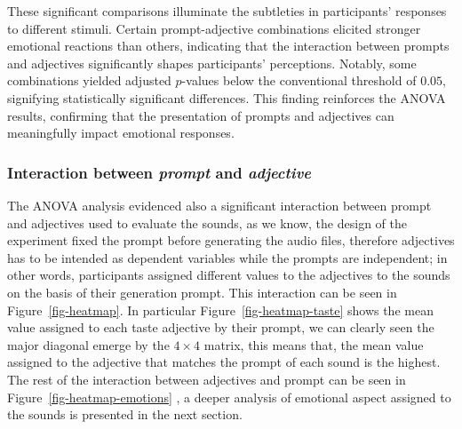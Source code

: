 \documentclass[
  letterpaper,
  DIV=11,
  numbers=noendperiod]{scrartcl}
\begin{document}
These significant comparisons illuminate the subtleties in participants'
responses to different stimuli. Certain prompt-adjective combinations
elicited stronger emotional reactions than others, indicating that the
interaction between prompts and adjectives significantly shapes
participants' perceptions. Notably, some combinations yielded adjusted
\(p\)-values below the conventional threshold of \(0.05\), signifying
statistically significant differences. This finding reinforces the ANOVA
results, confirming that the presentation of prompts and adjectives can
meaningfully impact emotional responses.

\subsubsection{\texorpdfstring{Interaction between \emph{prompt} and
\emph{adjective}}{Interaction between prompt and adjective}}\label{interaction-between-prompt-and-adjective}

The ANOVA analysis evidenced also a significant interaction between
prompt and adjectives used to evaluate the sounds, as we know, the
design of the experiment fixed the prompt before generating the audio
files, therefore adjectives has to be intended as dependent variables
while the prompts are independent; in other words, participants assigned
different values to the adjectives to the sounds on the basis of their
generation prompt. This interaction can be seen in
Figure~\ref{fig-heatmap}. In particular Figure~\ref{fig-heatmap-taste}
shows the mean value assigned to each taste adjective by their prompt,
we can clearly seen the major diagonal emerge by the \(4 \times 4\)
matrix, this means that, the mean value assigned to the adjective that
matches the prompt of each sound is the highest. The rest of the
interaction between adjectives and prompt can be seen in
Figure~\ref{fig-heatmap-emotions} , a deeper analysis of emotional
aspect assigned to the sounds is presented in the next section.
\end{document}
